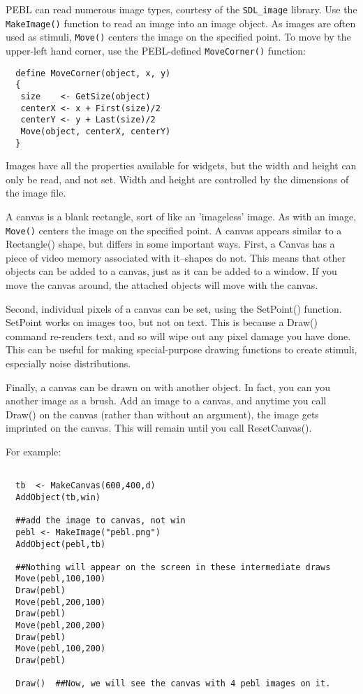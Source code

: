 
PEBL can read numerous image types, courtesy of the
\texttt{SDL\_image} library.  Use the \texttt{MakeImage()} function to
read an image into an image object.  As images are often used as
stimuli, \texttt{Move()} centers the image on the specified point.  To
move by the upper-left hand corner, use the PEBL-defined
\texttt{MoveCorner()} function:
\begin{verbatim}
  define MoveCorner(object, x, y)
  {
   size    <- GetSize(object)
   centerX <- x + First(size)/2
   centerY <- y + Last(size)/2
   Move(object, centerX, centerY)
  }
\end{verbatim}

Images have all the properties available for widgets, but the width
and height can only be read, and not set.  Width and height are
controlled by the dimensions of the image file.


A canvas is a blank rectangle, sort of like an 'imageless' image. As
with an image, \texttt{Move()} centers the image on the specified
point. A canvas appears similar to a Rectangle() shape, but differs in
some important ways.  First, a Canvas has a piece of video memory
associated with it--shapes do not.  This means that other objects can
be added to a canvas, just as it can be added to a window.  If you
move the canvas around, the attached objects will move with the
canvas.  

Second, individual pixels of a canvas can be set, using the SetPoint()
function. SetPoint works on images too, but not on text.  This is
because a Draw() command re-renders text, and so will wipe out any
pixel damage you have done.  This can be useful for making
special-purpose drawing functions to create stimuli, especially noise
distributions.

Finally, a canvas can be drawn on with another object.  In fact, you can you
another image as a brush.  Add an image to a canvas, and anytime you
call Draw() on the canvas (rather than without an argument), the image
gets imprinted on the canvas.  This will remain until you call
ResetCanvas().

For example:
\begin{verbatim}

  tb  <- MakeCanvas(600,400,d)
  AddObject(tb,win)

  ##add the image to canvas, not win
  pebl <- MakeImage("pebl.png")
  AddObject(pebl,tb)

  ##Nothing will appear on the screen in these intermediate draws
  Move(pebl,100,100)
  Draw(pebl)
  Move(pebl,200,100)
  Draw(pebl)
  Move(pebl,200,200)
  Draw(pebl)
  Move(pebl,100,200)
  Draw(pebl)

  Draw()  ##Now, we will see the canvas with 4 pebl images on it.
\end{verbatim}


